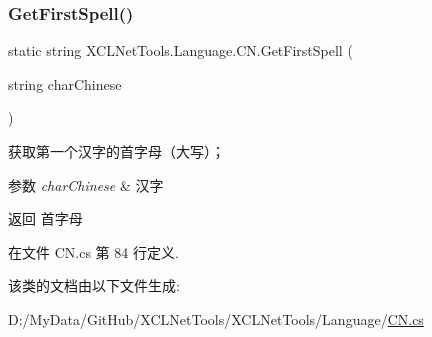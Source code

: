 \subsubsection{\texorpdfstring{Get\+First\+Spell()}{GetFirstSpell()}}
{\footnotesize\ttfamily static string X\+C\+L\+Net\+Tools.\+Language.\+C\+N.\+Get\+First\+Spell (\begin{DoxyParamCaption}\item[{string}]{char\+Chinese }\end{DoxyParamCaption})\hspace{0.3cm}{\ttfamily [static]}}



获取第一个汉字的首字母（大写）； 


\begin{DoxyParams}{参数}
{\em char\+Chinese} & 汉字\\
\hline
\end{DoxyParams}
\begin{DoxyReturn}{返回}
首字母
\end{DoxyReturn}


在文件 C\+N.\+cs 第 84 行定义.



该类的文档由以下文件生成\+:\begin{DoxyCompactItemize}
\item 
D\+:/\+My\+Data/\+Git\+Hub/\+X\+C\+L\+Net\+Tools/\+X\+C\+L\+Net\+Tools/\+Language/\hyperlink{_c_n_8cs}{C\+N.\+cs}\end{DoxyCompactItemize}
